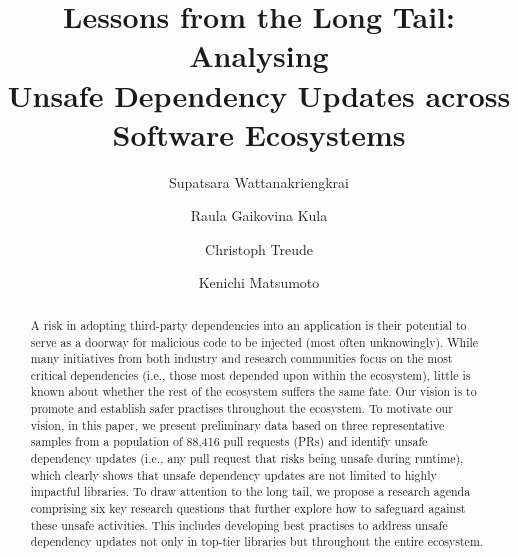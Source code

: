 \documentclass[sigconf,screen]{acmart}
\begin{document}
\begin{sloppy}

\acmPrice{}


\title{Lessons from the Long Tail: Analysing \\ Unsafe Dependency Updates across Software Ecosystems}

\author{Supatsara Wattanakriengkrai}

\author{Raula Gaikovina Kula}

\author{Christoph Treude}

\author{Kenichi Matsumoto}

\begin{abstract}
A risk in adopting third-party dependencies into an application is their potential to serve as a doorway for malicious code to be injected (most often unknowingly).
While many initiatives from both industry and research communities focus on the most critical dependencies (i.e., those most depended upon within the ecosystem), little is known about whether the rest of the ecosystem suffers the same fate. Our vision is to promote and establish safer practises throughout the ecosystem.
To motivate our vision, in this paper, we present preliminary data based on three representative samples from a population of 88,416 pull requests (PRs) and identify unsafe dependency updates (i.e., any pull request that risks being unsafe during runtime), which clearly shows that unsafe dependency updates are not limited to highly impactful libraries.
To draw attention to the long tail, we propose a research agenda comprising six key research questions that further explore how to safeguard against these unsafe activities. This includes developing best practises to address unsafe dependency updates not only in top-tier libraries but throughout the entire ecosystem.
\end{abstract}


\end{sloppy}
\end{document}

